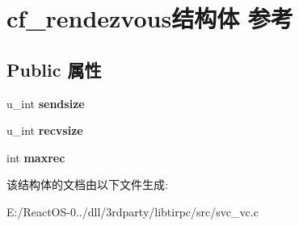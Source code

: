 \hypertarget{structcf__rendezvous}{}\section{cf\+\_\+rendezvous结构体 参考}
\label{structcf__rendezvous}
\subsection*{Public 属性}
\begin{DoxyCompactItemize}
\item 
\mbox{\label{structcf__rendezvous_a2fd26ec86be88c77c85a4ff1d2aef81d}} 
u\+\_\+int {\bfseries sendsize}
\item 
\mbox{\label{structcf__rendezvous_ae937fc2ec6874814eacbe50fc6e4c2f5}} 
u\+\_\+int {\bfseries recvsize}
\item 
\mbox{\label{structcf__rendezvous_a6b8c5aab979fb181472fee1db38d3d3b}} 
int {\bfseries maxrec}
\end{DoxyCompactItemize}


该结构体的文档由以下文件生成\+:\begin{DoxyCompactItemize}
\item 
E\+:/\+React\+O\+S-\/0../dll/3rdparty/libtirpc/src/svc\+\_\+vc.\+c\end{DoxyCompactItemize}
